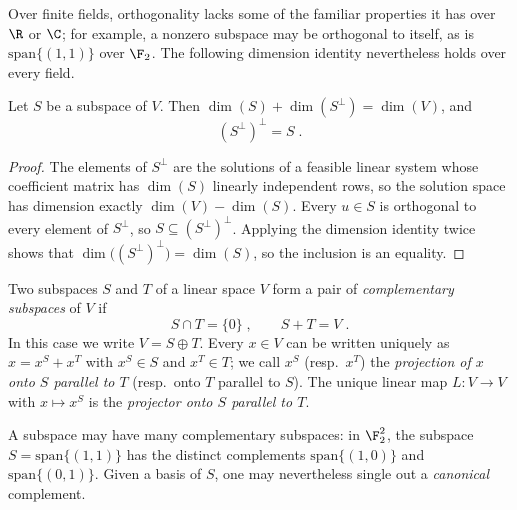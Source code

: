 Over finite fields, orthogonality lacks some of the familiar properties it has
over $\R$ or $\C$; for example, a nonzero subspace may be orthogonal to itself,
as is $\mathrm{span}\{(1,1)\}$ over $\F_2$. The following dimension identity
nevertheless holds over every field.

\begin{lemma}\label{lem:perp_perp}
	\leanok
	Let $S$ be a subspace of $V$. Then $\dim(S) + \dim(S^\perp) = \dim(V)$, and
	\[
		(S^\perp)^\perp = S\;.
	\]
\end{lemma}
\begin{proof}
	\leanok
	The elements of $S^\perp$ are the solutions of a feasible linear system whose
	coefficient matrix has $\dim(S)$ linearly independent rows, so the solution
	space has dimension exactly $\dim(V) - \dim(S)$. Every $u \in S$ is
	orthogonal to every element of $S^\perp$, so $S \subseteq (S^\perp)^\perp$.
	Applying the dimension identity twice shows that
	$\dim\bigl((S^\perp)^\perp\bigr) = \dim(S)$, so the inclusion is an equality.
\end{proof}

\begin{definition}\label{def:complementary}
	Two subspaces $S$ and $T$ of a linear space $V$ form a pair of
	\emph{complementary subspaces} of $V$ if
	\[
		S \cap T = \{0\}\;, \qquad S + T = V\;.
	\]
	In this case we write $V = S \oplus T$. Every $x \in V$ can be written
	uniquely as $x = x^S + x^T$ with $x^S \in S$ and $x^T \in T$; we call $x^S$
	(resp.\ $x^T$) the \emph{projection of $x$ onto $S$ parallel to $T$} (resp.\
	onto $T$ parallel to $S$). The unique linear map $L : V \to V$ with
	$x \mapsto x^S$ is the \emph{projector onto $S$ parallel to $T$}.
\end{definition}

A subspace may have many complementary subspaces: in $\F_2^2$, the subspace
$S = \mathrm{span}\{(1,1)\}$ has the distinct complements
$\mathrm{span}\{(1,0)\}$ and $\mathrm{span}\{(0,1)\}$. Given a basis of $S$,
one may nevertheless single out a \emph{canonical} complement.

